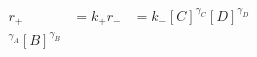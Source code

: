 \begin{eqnarray}
r_+  & =  k_+
r_-  & =  k_-[C]^{\gamma_C}[D]^{\gamma_D} \\[A]^{\gamma_A}[B]^{\gamma_B} \\
\end{eqnarray}